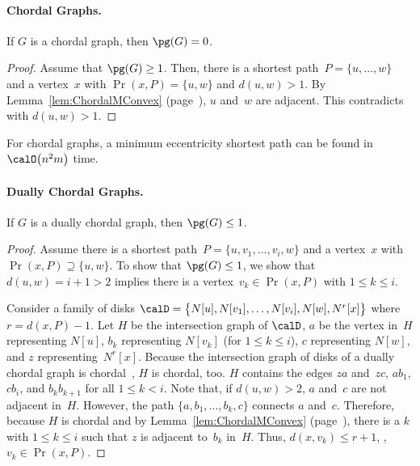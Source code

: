 \paragraph{Chordal Graphs.}

\begin{lemma}
If \( G \) is a chordal graph, then \( \pg(G) = 0 \).
\end{lemma}

\begin{proof}
Assume that $\pg(G) \geq 1$.
Then, there is a shortest path~$P = \{ u, \ldots, w \}$ and a vertex~$x$ with $\Pr(x, P) = \{ u, w \}$ and $d(u, w) > 1$.
By Lemma~\ref{lem:ChordalMConvex} (page~\pageref{lem:ChordalMConvex}), $u$ and~$w$ are adjacent.
This contradicts with $d(u, w) > 1$.
\end{proof}

\begin{corollary}
    \label{cor:mespChordal}
For chordal graphs, a minimum eccentricity shortest path can be found in \( \calO \big( n^2 m \big) \) time.
\end{corollary}


\paragraph{Dually Chordal Graphs.}

\begin{lemma}
If \( G \) is a dually chordal graph, then \( \pg(G) \leq 1 \).
\end{lemma}

\begin{proof}
Assume there is a shortest path~$P = \{ u, v_1, \ldots, v_i , w \}$ and a vertex~$x$ with $\Pr(x, P) \supseteq \{ u, w \}$.
To show that $\pg(G) \leq 1$, we show that $d(u, w) = i + 1 > 2$ implies there is a vertex~$v_k \in \Pr(x, P)$ with $1 \leq k \leq i$.

Consider a family of disks $\calD = \big \{ N[u], N[v_{1}], \ldots, N[v_{i}], N[w], N^r[x]  \big \}$ where $r = d(x, P) - 1$.
Let $H$ be the intersection graph of $\calD$, $a$ be the vertex in~$H$ representing $N[u]$, $b_k$ representing $N[v_{k}]$ (for $1 \leq k \leq i$), $c$ representing $N[w]$, and $z$ representing~$N^r[x]$.
Because the intersection graph of disks of a dually chordal graph is chordal~\cite{BraDraCheVol1998}, $H$ is chordal, too.
$H$ contains the edges $za$ and~$zc$, $ab_1$, $cb_i$, and $b_kb_{k+1}$ for all $1 \leq k < i$.
Note that, if $d(u, w) > 2$, $a$ and~$c$ are not adjacent in~$H$.
However, the path $\{ a, b_1, \ldots, b_k, c \}$ connects $a$ and~$c$.
Therefore, because $H$ is chordal and by Lemma~\ref{lem:ChordalMConvex} (page~\pageref{lem:ChordalMConvex}), there is a $k$ with $1 \leq k \leq i$ such that $z$ is adjacent to~$b_k$ in~$H$.
Thus, $d(x, v_k) \leq r + 1$, \ie, $v_k \in \Pr(x, P)$.
\end{proof}

